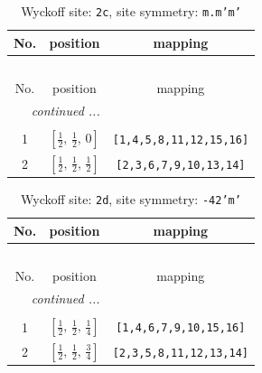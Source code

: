 \documentclass[fleqn,8pt]{jsarticle}
\begin{document}
\renewcommand{\arraystretch}{1.2}
\begin{longtable}{ccc}
\caption{Wyckoff site: {\tt 2c}, site symmetry: {\tt m.m'm'}}
 \\
 \hline \hline
No. & position & mapping \\ \hline \endfirsthead

\multicolumn{2}{l}{\tablename\ \thetable{}} \\
 \hline \hline
No. & position & mapping \\ \hline \endhead

 \hline \hline
\multicolumn{2}{r}{\footnotesize\it continued ...} \\ \endfoot

 \hline \hline
\multicolumn{2}{r}{} \\ \endlastfoot

1 & $\left[ \frac{1}{2},\, \frac{1}{2},\, 0 \right]$ & {\tt [1,4,5,8,11,12,15,16]} \\ \hline
2 & $\left[ \frac{1}{2},\, \frac{1}{2},\, \frac{1}{2} \right]$ & {\tt [2,3,6,7,9,10,13,14]} \\
\end{longtable}
\renewcommand{\arraystretch}{1.2}
\begin{longtable}{ccc}
\caption{Wyckoff site: {\tt 2d}, site symmetry: {\tt -42'm'}}
 \\
 \hline \hline
No. & position & mapping \\ \hline \endfirsthead

\multicolumn{2}{l}{\tablename\ \thetable{}} \\
 \hline \hline
No. & position & mapping \\ \hline \endhead

 \hline \hline
\multicolumn{2}{r}{\footnotesize\it continued ...} \\ \endfoot

 \hline \hline
\multicolumn{2}{r}{} \\ \endlastfoot

1 & $\left[ \frac{1}{2},\, \frac{1}{2},\, \frac{1}{4} \right]$ & {\tt [1,4,6,7,9,10,15,16]} \\ \hline
2 & $\left[ \frac{1}{2},\, \frac{1}{2},\, \frac{3}{4} \right]$ & {\tt [2,3,5,8,11,12,13,14]} \\
\end{longtable}
\renewcommand{\arraystretch}{1.2}
\end{document}
